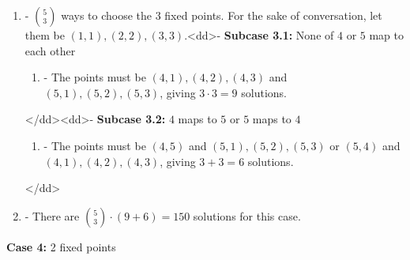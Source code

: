\begin{enumerate}
 
            \begin{enumerate}[label=(\roman*)]
                \item - $\binom 53$ ways to choose the $3$ fixed points.  For the sake of conversation, let them be $(1, 1), (2, 2), (3, 3)$.<dd>- \textbf{Subcase 3.1:} None of $4$ or $5$ map to each other
            \begin{enumerate}[label=(\roman*)]
                \item - The points must be $(4, 1), (4, 2), (4, 3)$ and $(5, 1), (5, 2), (5, 3)$, giving $3 \cdot 3 = 9$ solutions.
            \end{enumerate}
            </dd><dd>- \textbf{Subcase 3.2:} $4$ maps to $5$ or $5$ maps to $4$
            \begin{enumerate}[label=(\roman*)]
                \item - The points must be $(4, 5)$ and $(5, 1), (5, 2), (5, 3)$ or $(5, 4)$ and $(4, 1), (4, 2), (4, 3)$, giving $3+3 = 6$ solutions.
            \end{enumerate}
            </dd>\item - There are $\binom 53 \cdot (9+6) = 150$ solutions for this case.
            \end{enumerate}
            \textbf{Case 4:} 2 fixed points


\end{enumerate}
